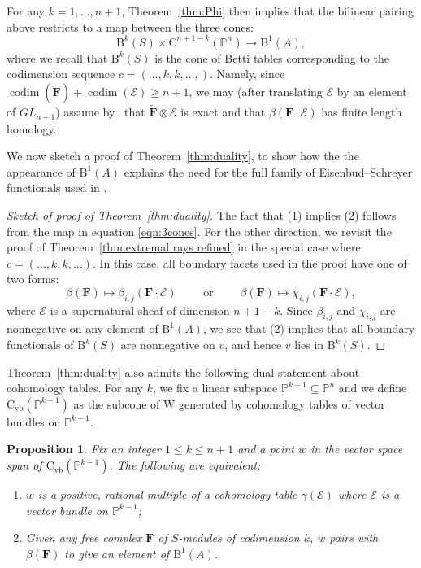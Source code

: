\documentclass[12pt]{amsart}
\newtheorem{prop}[lemma]{Proposition}
\theoremstyle{definition}
\theoremstyle{remark}
\newcommand{\codim}{\operatorname{codim}}
\newcommand{\PP}{\mathbb{P}}
\newcommand{\WW}{\mathrm{W}}
\newcommand{\cc}{c}
\newcommand{\cE}{\mathcal{E}}
\newcommand{\FF}{\mathbf{F}}
\newcommand{\GL}{{GL}}
\newcommand{\CQ}{\mathrm{C}}
\newcommand{\CvbQ}{\mathrm{C}_{\text{vb}}}
\newcommand{\BBQ}{\mathrm{B}}
\begin{document}
For any $k=1, \dots, n+1$, Theorem~\ref{thm:Phi} then implies that the bilinear pairing above restricts to a map between the three cones:
\begin{equation}\label{eqn:3cones}
\BBQ^{k}(S)\times \CQ^{n+1-k}(\PP^n)\to \BBQ^1(A),
\end{equation}
where we recall that $\BBQ^k(S)$ is the cone of Betti tables corresponding to the codimension sequence $\cc=(\dots,k,k,\dots,)$.
Namely, since $\codim(\widetilde{\FF})+\codim(\cE)\geq n+1$, we may (after translating $\cE$ by an element of $\GL_{n+1}$) assume by~\cite[Theorem, p. 335]{miller-speyer} that $\widetilde{\FF}\otimes \cE$ is exact and that $\beta(\FF\cdot \cE)$ has finite length homology.

We now sketch a proof of Theorem~\ref{thm:duality}, to show how the 
the appearance of $\BBQ^1(A)$ explains the need for the full family of Eisenbud--Schreyer functionals used in \cite{eis-schrey1}.
\begin{proof}[Sketch of proof of Theorem~\ref{thm:duality}]
The fact that (1) implies (2) follows from the map in equation \eqref{eqn:3cones}. For the other direction, we revisit the proof of Theorem~\ref{thm:extremal rays refined} in the special case where $\cc=(\dots, k,k,\dots)$.  In this case, all boundary facets used in the proof have one of two forms:
\[
\beta(\FF)\mapsto\beta_{i,j}(\FF\cdot \cE) \qquad \text{ or } \qquad \beta(\FF)\mapsto\chi_{i,j}(\FF\cdot \cE),
\]
where $\cE$ is a supernatural sheaf of dimension $n+1-k$.  Since $\beta_{i,j}$ and $\chi_{i,j}$ are nonnegative on any element of $\BBQ^1(A)$, we see that (2) implies that all boundary functionals of $\BBQ^k(S)$ are nonnegative on $v$, and hence $v$ lies in $\BBQ^k(S)$.
\end{proof}
%
Theorem~\ref{thm:duality} also admits the following dual statement about cohomology tables.  For any $k$, we fix a linear subspace $\PP^{k-1}\subseteq \PP^n$ and we define $\CvbQ(\PP^{k-1})$ as the subcone of $\WW$ generated by cohomology tables of vector bundles on $\PP^{k-1}$.
\begin{prop}\label{prop:other}
Fix an integer $1\leq k\leq n+1$ and a point $w$ in the vector space span of $\CvbQ(\PP^{k-1})$.   The following are equivalent:
\begin{enumerate}
	\item   $w$ is a positive, rational multiple of a cohomology table $\gamma(\cE)$ where $\cE$ is a vector bundle on $\PP^{k-1}$;
	\item  Given any free complex $\FF$ of $S$-modules of codimension $k$, $w$ pairs with $\beta(\FF)$ to give an element of $\BBQ^1(A)$.
\end{enumerate}
\end{prop}
\end{document}
